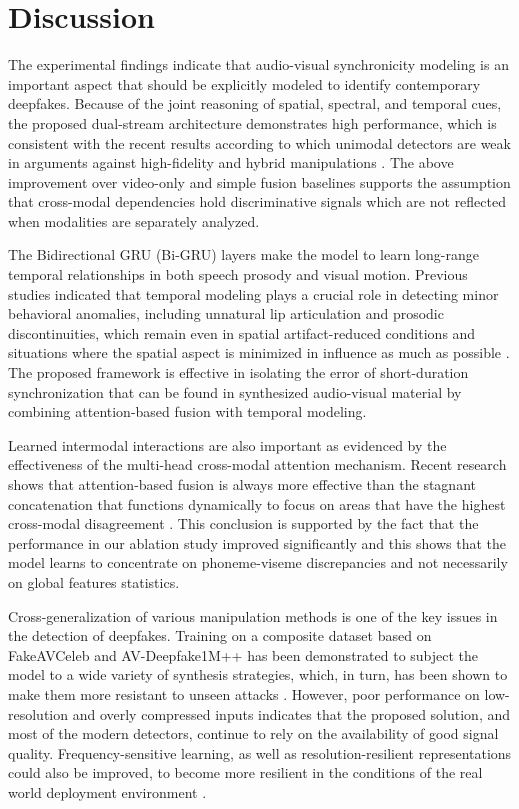 \documentclass[conference]{IEEEtran}
\begin{document}
\section{Discussion}

The experimental findings indicate that audio-visual synchronicity modeling is an important aspect that should be explicitly modeled to identify contemporary deepfakes. Because of the joint reasoning of spatial, spectral, and temporal cues, the proposed dual-stream architecture demonstrates high performance, which is consistent with the recent results according to which unimodal detectors are weak in arguments against high-fidelity and hybrid manipulations \cite{Dolhansky2022Generalization}. The above improvement over video-only and simple fusion baselines supports the assumption that cross-modal dependencies hold discriminative signals which are not reflected when modalities are separately analyzed.

The Bidirectional GRU (Bi-GRU) layers make the model to learn long-range temporal relationships in both speech prosody and visual motion. Previous studies indicated that temporal modeling plays a crucial role in detecting minor behavioral anomalies, including unnatural lip articulation and prosodic discontinuities, which remain even in spatial artifact-reduced conditions and situations where the spatial aspect is minimized in influence as much as possible \cite{Sabir2022,Jung2023Temporal}. The proposed framework is effective in isolating the error of short-duration synchronization that can be found in synthesized audio-visual material by combining attention-based fusion with temporal modeling.

Learned intermodal interactions are also important as evidenced by the effectiveness of the multi-head cross-modal attention mechanism. Recent research shows that attention-based fusion is always more effective than the stagnant concatenation that functions dynamically to focus on areas that have the highest cross-modal disagreement \cite{Li2022Attention,Katamneni2024}. This conclusion is supported by the fact that the performance in our ablation study improved significantly and this shows that the model learns to concentrate on phoneme-viseme discrepancies and not necessarily on global features statistics.

Cross-generalization of various manipulation methods is one of the key issues in the detection of deepfakes. Training on a composite dataset based on FakeAVCeleb and AV-Deepfake1M++ has been demonstrated to subject the model to a wide variety of synthesis strategies, which, in turn, has been shown to make them more resistant to unseen attacks \cite{Jung2024,Kim2024Freq}. However, poor performance on low-resolution and overly compressed inputs indicates that the proposed solution, and most of the modern detectors, continue to rely on the availability of good signal quality. Frequency-sensitive learning, as well as resolution-resilient representations could also be improved, to become more resilient in the conditions of the real world deployment environment \cite{Kim2024Freq}.
\end{document}
